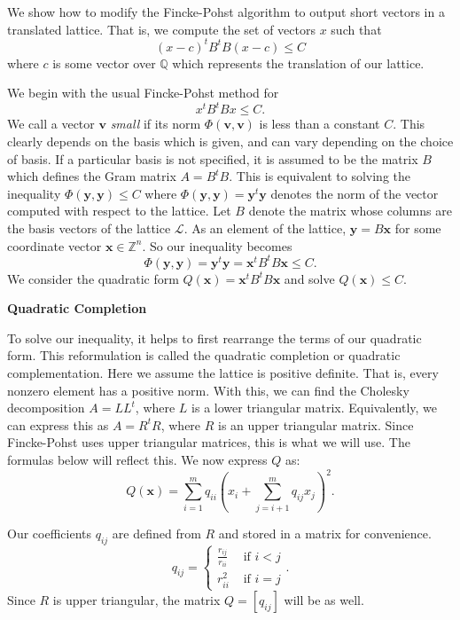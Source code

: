 We show how to modify the Fincke-Pohst algorithm to output short vectors in a translated lattice. That is, we compute the set of vectors $x$ such that 
\[(x-c)^tB^tB(x-c) \leq C\]
where $c$ is some vector over $\mathbb{Q}$ which represents the translation of our lattice. 


We begin with the usual Fincke-Pohst method for 
\[x^tB^tBx \leq C.\]
We call a vector $\mathbf{v}$ \textit{small} if its norm $\Phi(\mathbf{v}, \mathbf{v})$ is less than a constant $C$. This clearly depends on the basis which is given, and can vary depending on the choice of basis. If a particular basis is not specified, it is assumed to be the matrix $B$ which defines the Gram matrix $A = B^tB$. This is equivalent to solving the inequality $\Phi(\mathbf{y}, \mathbf{y}) \leq C$ where $\Phi(\mathbf{y}, \mathbf{y}) = \mathbf{y}^t\mathbf{y}$ denotes the norm of the vector computed with respect to the lattice. Let $B$ denote the matrix whose columns are the basis vectors of the lattice $\mathcal{L}$. As an element of the lattice, $\mathbf{y} = B\mathbf{x}$ for some coordinate vector $\mathbf{x} \in \mathbb{Z}^n$. So our inequality becomes
\[\Phi(\mathbf{y}, \mathbf{y}) = \mathbf{y}^t\mathbf{y} = \mathbf{x}^tB^tB\mathbf{x} \leq C.\] 
We consider the quadratic form $Q(\mathbf{x}) = \mathbf{x}^t B^t B\mathbf{x}$ and solve $Q(\mathbf{x}) \leq C$.


\textbf{Quadratic Completion}

To solve our inequality, it helps to first rearrange the terms of our quadratic form. This reformulation is called the quadratic completion or quadratic complementation. Here we assume the lattice is positive definite. That is, every nonzero element has a positive norm. With this, we can find the Cholesky decomposition $A = LL^t$, where $L$ is a lower triangular matrix. Equivalently, we can express this as $A = R^t R$, where $R$ is an upper triangular matrix. Since Fincke-Pohst uses upper triangular matrices, this is what we will use. The formulas below will reflect this. We now express $Q$ as:
\[ Q(\mathbf{x}) = \sum_{i=1}^m q_{ii}\left( x_i + \sum_{j=i+1}^m q_{ij}x_j\right)^2.\]

Our coefficients $q_{ij}$ are defined from $R$ and stored in a matrix for convenience.
\[q_{ij} =
\begin{cases}
\frac{r_{ij}}{r_{ii}} & \text{ if } i < j\\
r_{ii}^2 & \text{ if } i = j
\end{cases}.\]
Since $R$ is upper triangular, the matrix $Q = [q_{ij}]$ will be as well.

